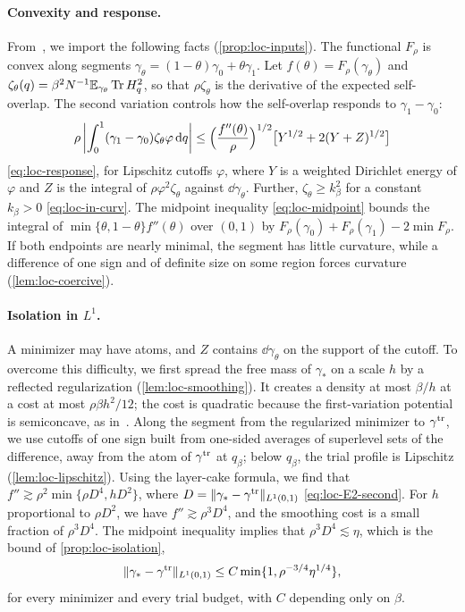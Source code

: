 \paragraph{Convexity and response.}
From~\cite[Section~7.4 and Appendix~A]{AL}, we import the following
facts (\cref{prop:loc-inputs}). The functional $F_\rho$ is convex along
segments $\gamma_\theta=(1-\theta)\gamma_0+\theta\gamma_1$. Let
$f(\theta)=F_\rho(\gamma_\theta)$
and $\zeta_\theta(q)=\beta^2N^{-1}\mathbb E_{\gamma_\theta}\operatorname{Tr} H_q^2$, so that
$\rho\zeta_\theta$ is the derivative of the expected self-overlap. The
second variation controls how the self-overlap responds to
$\gamma_1-\gamma_0$:
\[
 \rho\left|\int_0^1(\gamma_1-\gamma_0)\zeta_\theta\varphi\,\mathrm d q\right|
 \le\Bigl(\frac{f''(\theta)}\rho\Bigr)^{1/2}
 \bigl[Y^{1/2}+2(Y+Z)^{1/2}\bigr]
\]
\eqref{eq:loc-response}, for Lipschitz cutoffs $\varphi$, where $Y$ is a
weighted Dirichlet energy of $\varphi$ and $Z$ is the integral of
$\rho\varphi^2\zeta_\theta$ against $\dd\gamma_\theta$. Further,
$\zeta_\theta\ge k_\beta^2$ for a constant $k_\beta>0$
\eqref{eq:loc-in-curv}. The midpoint inequality \eqref{eq:loc-midpoint}
bounds the integral of $\min\{\theta,1-\theta\}f''(\theta)$ over
$(0,1)$ by $F_\rho(\gamma_0)+F_\rho(\gamma_1)-2\min F_\rho$. If both
endpoints are nearly minimal, the segment has little
curvature, while a difference of one sign and of definite size on some
region forces curvature (\cref{lem:loc-coercive}).

\paragraph{\texorpdfstring{Isolation in $L^1$.}{Isolation in L1.}}
A minimizer may have atoms, and $Z$ contains $\dd\gamma_\theta$ on the
support of the cutoff. To overcome this difficulty, we first spread the
free mass of $\gamma_*$ on a scale $h$ by a reflected regularization
(\cref{lem:loc-smoothing}). It creates a density at most $\beta/h$ at a
cost at most $\rho\beta h^2/12$; the cost is quadratic because the
first-variation potential is semiconcave, as in~\cite[Lemma~7.5]{AL}.
Along the segment from the regularized minimizer to $\gamma^{\rm tr}$,
we use cutoffs of one sign built from one-sided averages of
superlevel sets of the difference, away from the atom of
$\gamma^{\rm tr}$ at $q_\beta$; below $q_\beta$, the trial profile is
Lipschitz (\cref{lem:loc-lipschitz}). Using the layer-cake formula, we
find that $f''\gtrsim\rho^2\min\{\rho D^4,hD^2\}$, where
$D=\|\gamma_*-\gamma^{\rm tr}\|_{L^1(0,1)}$ \eqref{eq:loc-E2-second}.
For $h$ proportional to $\rho D^2$, we have $f''\gtrsim\rho^3D^4$, and
the smoothing cost is a small fraction of $\rho^3D^4$. The midpoint
inequality implies that $\rho^3D^4\lesssim\eta$, which is the bound of
\cref{prop:loc-isolation},
\[
 \|\gamma_*-\gamma^{\rm tr}\|_{L^1(0,1)}
 \le C\min\{1,\rho^{-3/4}\eta^{1/4}\},
\]
for every minimizer and every trial budget, with $C$ depending only on
$\beta$.

